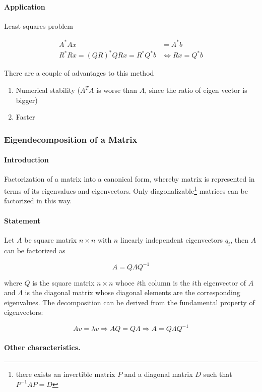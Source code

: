 \paragraph{Application} Least squares problem

\begin{equation*}
    \begin{split}
        A^*Ax & = A^*b\\
        R^*Rx = (QR)^*QRx = R^*Q^*b & \Leftrightarrow Rx = Q^*b
    \end{split}
\end{equation*}

There are a couple of advantages to this method
\begin{enumerate}[itemsep=0pt]
    \item Numerical stability ($A^TA$ is worse than $A$, since the ratio of eigen vector is bigger)
    \item Faster
\end{enumerate}

\subsubsection{Eigendecomposition of a Matrix} \label{sec:eigen-decomp}

\paragraph{Introduction} Factorization of a matrix into a canonical form, whereby matrix
is represented in terms of its eigenvalues and eigenvectors. Only diagonalizable\footnote{
    there exists an invertible matrix $P$ and a diagonal matrix $D$ such that $P^{-1}AP=D$
}
matrices can be factorized in this way.

\paragraph{Statement} Let $A$ be square matrix $n \times n$ with $n$ linearly independent
eigenvectors $q_i$, then $A$ can be factorized as 

\begin{equation*}
    A = Q\Lambda Q^{-1}
\end{equation*}

where $Q$ is the square matrix $n \times n$ whoce $i$th column is the $i$th eigenvector of 
$A$ and $\Lambda$ is the diagonal matrix whose diagonal elements are the corresponding
eigenvalues. The decomposition can be derived from the fundamental property of eigenvectors:

\begin{equation*}
    Av = \lambda v \Rightarrow AQ = Q\Lambda \Rightarrow A = Q\Lambda Q^{-1}
\end{equation*}

\paragraph{Other characteristics.}